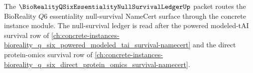 The $\BioRealityQSixEssentialityNullSurvivalLedgerUp$ packet routes the BioReality $Q6$ essentiality null-survival NameCert surface through the concrete instance module. The null-survival ledger is read after the powered modeled-tAI survival row of \autoref{ch:concrete-instances-bioreality_q_six_powered_modeled_tai_survival-namecert} and the direct protein-omics survival row of \autoref{ch:concrete-instances-bioreality_q_six_direct_protein_omics_survival-namecert}.


